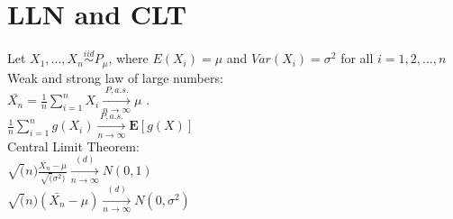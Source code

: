 \section{LLN and CLT}
Let $X_1, ..., X_n \stackrel{iid}{\sim} P_{\mu}$, where $E(X_i)=\mu$ and $Var(X_i)=\sigma^2$ for all $i=1,2,...,n$\\

Weak and strong law of large numbers:\\

$\bar{X_n}= \frac{1}{n} \sum_{i=1}^{n} X_i \xrightarrow[n \rightarrow \infty]{P, a.s.} \mu$ .\\

$ \frac{1}{n} \sum_{i=1}^{n} g(X_i) \xrightarrow[n \rightarrow \infty]{P, a.s.} \mathbf{E}[g(X)]$\\

Central Limit Theorem:\\

$\sqrt(n)\frac{\bar{X_n}-\mu}{\sqrt(\sigma^2)} \xrightarrow[n \rightarrow \infty]{(d)} N(0,1)$\\

$\sqrt(n)(\bar{X_n}-\mu) \xrightarrow[n \rightarrow \infty]{(d)} N(0,\sigma^2)$\\

